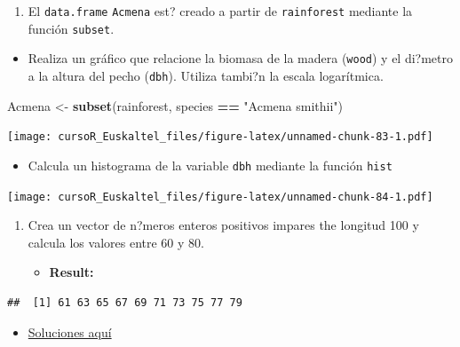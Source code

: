 \documentclass[]{book}
\newenvironment{Shaded}{\begin{snugshade}}{\end{snugshade}}
\newcommand{\KeywordTok}[1]{\textcolor[rgb]{0.13,0.29,0.53}{\textbf{#1}}}
\newcommand{\StringTok}[1]{\textcolor[rgb]{0.31,0.60,0.02}{#1}}
\newcommand{\OperatorTok}[1]{\textcolor[rgb]{0.81,0.36,0.00}{\textbf{#1}}}
\newcommand{\NormalTok}[1]{#1}
\providecommand{\tightlist}{%
  \setlength{\itemsep}{0pt}\setlength{\parskip}{0pt}}
\begin{document}
\begin{enumerate}
\def\labelenumi{\arabic{enumi}.}
\setcounter{enumi}{2}
\tightlist
\item
  El \texttt{data.frame} \texttt{Acmena} est? creado a partir de
  \texttt{rainforest} mediante la función \texttt{subset}.
\end{enumerate}

\begin{itemize}
\tightlist
\item
  Realiza un gráfico que relacione la biomasa de la madera
  (\texttt{wood}) y el di?metro a la altura del pecho (\texttt{dbh}).
  Utiliza tambi?n la escala logarítmica.
\end{itemize}

\begin{Shaded}
\begin{Highlighting}[]
\NormalTok{Acmena <-}\StringTok{ }\KeywordTok{subset}\NormalTok{(rainforest, species }\OperatorTok{==}\StringTok{ "Acmena smithii"}\NormalTok{)}
\end{Highlighting}
\end{Shaded}

\texttt{[image: cursoR\_Euskaltel\_files/figure-latex/unnamed-chunk-83-1.pdf]}

\begin{itemize}
\tightlist
\item
  Calcula un histograma de la variable \texttt{dbh} mediante la función
  \texttt{hist}
\end{itemize}

\texttt{[image: cursoR\_Euskaltel\_files/figure-latex/unnamed-chunk-84-1.pdf]}

\begin{enumerate}
\def\labelenumi{\arabic{enumi}.}
\setcounter{enumi}{3}
\item
  Crea un vector de n?meros enteros positivos impares the longitud 100 y
  calcula los valores entre 60 y 80.

  \begin{itemize}
  \tightlist
  \item
    \textbf{Result:}
  \end{itemize}
\end{enumerate}

\begin{verbatim}
##  [1] 61 63 65 67 69 71 73 75 77 79
\end{verbatim}

\begin{itemize}
\tightlist
\item
  \href{http://idaejin.github.io/bcam-courses/rbasics/rbasics_sol.R}{Soluciones
  aquí}
\end{itemize}
\end{document}
